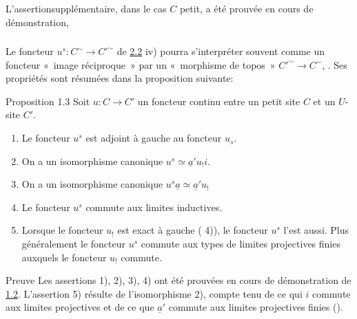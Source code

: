 \documentclass[10pt]{../fichiers-configuration-latex/smfart}
\begin{document}
L'assertion\pageoriginale supplémentaire, dans le cas $C$ petit,
a été prouvée en cours de démonstration, \cqfd

\setcounter{subsection}{2} \setcounter{subsubsection}{0}
\subsubsection{}

Le foncteur $u^s:C^{\sim}\rightarrow {C'}^{\sim}$ de
\hyperref[III.prop2.2]{2.2} iv) pourra s'interpréter souvent comme un
foncteur « image réciproque » par un « morphisme de topos » ${C'}^{\sim}\rightarrow C^{\sim}$, \cf {}. Ses
propriétés sont résumées dans la proposition
suivante:

\begin{enonce*}{Proposition 1.3}
Soit $u:C\rightarrow C'$ un foncteur continu entre un petit site $C$
et un $U$-site $C'$.
\begin{enumerate}
\renewcommand{\labelenumi}{\theenumi)}
\item Le foncteur $u^s$ est adjoint à gauche au foncteur $u_s$.

\item On a un isomorphisme canonique $u^s\simeq \underline{a}'u_{!}i$.

\item On a un isomorphisme canonique $u^s\underline{a}\simeq
  \underline{a}'u_{!}$

\item Le foncteur $u^s$ commute aux limites inductives.

\item Lorsque le foncteur $u_{!}$ est exact à gauche (\cf {} 4)),
  le foncteur $u^s$ l'est aussi. Plus généralement le foncteur
  $u^s$ commute aux types de limites projectives finies auxquels le
  foncteur $u_{!}$ commute.
\end{enumerate}
\end{enonce*}

\begin{enonce*}[remark]{Preuve}
Les assertions 1), 2), 3), 4) ont été prouvées en cours
de démonstration de \hyperref[III.prop1.2]{1.2}. L'assertion 5)
résulte de l'isomorphisme 2), compte tenu de ce qui $i$ commute
aux limites projectives et de ce que $\underline{a}'$ commute aux
limites projectives finies ().
\end{enonce*}
\end{document}

